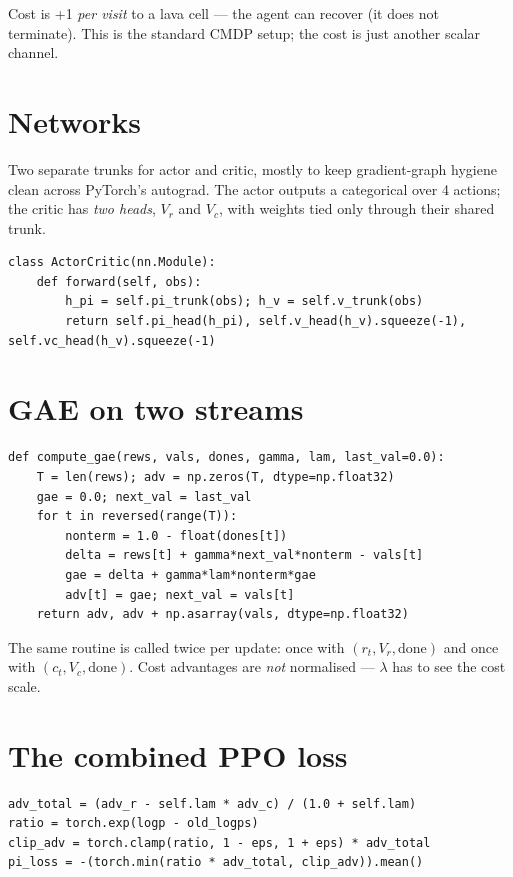 \documentclass[11pt,oneside]{scrbook}
\begin{document}
Cost is +1 \emph{per visit} to a lava cell --- the agent can recover (it does
not terminate). This is the standard CMDP setup; the cost is just another
scalar channel.

\section{Networks}

Two separate trunks for actor and critic, mostly to keep gradient-graph
hygiene clean across PyTorch's autograd. The actor outputs a categorical over
4 actions; the critic has \emph{two heads}, $V_r$ and $V_c$, with weights tied
only through their shared trunk.

\begin{verbatim}
class ActorCritic(nn.Module):
    def forward(self, obs):
        h_pi = self.pi_trunk(obs); h_v = self.v_trunk(obs)
        return self.pi_head(h_pi), self.v_head(h_v).squeeze(-1), self.vc_head(h_v).squeeze(-1)
\end{verbatim}

\section{GAE on two streams}

\begin{verbatim}
def compute_gae(rews, vals, dones, gamma, lam, last_val=0.0):
    T = len(rews); adv = np.zeros(T, dtype=np.float32)
    gae = 0.0; next_val = last_val
    for t in reversed(range(T)):
        nonterm = 1.0 - float(dones[t])
        delta = rews[t] + gamma*next_val*nonterm - vals[t]
        gae = delta + gamma*lam*nonterm*gae
        adv[t] = gae; next_val = vals[t]
    return adv, adv + np.asarray(vals, dtype=np.float32)
\end{verbatim}

The same routine is called twice per update: once with $(r_t, V_r, \text{done})$
and once with $(c_t, V_c, \text{done})$. Cost advantages are \emph{not}
normalised --- $\lambda$ has to see the cost scale.

\section{The combined PPO loss}

\begin{verbatim}
adv_total = (adv_r - self.lam * adv_c) / (1.0 + self.lam)
ratio = torch.exp(logp - old_logps)
clip_adv = torch.clamp(ratio, 1 - eps, 1 + eps) * adv_total
pi_loss = -(torch.min(ratio * adv_total, clip_adv)).mean()
\end{verbatim}
\end{document}

